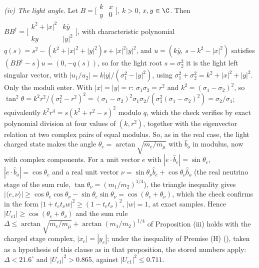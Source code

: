 \emph{(iv) The light angle.} Let $B = \bigl[\begin{smallmatrix} k & x\\ y & 0\end{smallmatrix}\bigr]$, $k > 0$, $x, y \in \C$. Then $BB^{\dagger} = \bigl[\begin{smallmatrix} k^{2} + |x|^{2} & k\bar{y}\\ ky & |y|^{2}\end{smallmatrix}\bigr]$, with characteristic polynomial $q(s) = s^{2} - (k^{2} + |x|^{2} + |y|^{2})s + |x|^{2}|y|^{2}$, and $u = (k\bar{y},\ s - k^{2} - |x|^{2})$ satisfies $(BB^{\dagger} - s)u = (0, -q(s))$, so for the light root $s = \sigma_{2}^{2}$ it is the light left singular vector, with $|u_{1}/u_{2}| = k|y|/(\sigma_{1}^{2} - |y|^{2})$, using $\sigma_{1}^{2} + \sigma_{2}^{2} = k^{2} + |x|^{2} + |y|^{2}$. Only the moduli enter. With $|x| = |y| = r$: $\sigma_{1}\sigma_{2} = r^{2}$ and $k^{2} = (\sigma_{1} - \sigma_{2})^{2}$, so $\tan^{2}\theta = k^{2}r^{2}/(\sigma_{1}^{2} - r^{2})^{2} = (\sigma_{1} - \sigma_{2})^{2}\sigma_{1}\sigma_{2}/(\sigma_{1}^{2}(\sigma_{1} - \sigma_{2})^{2}) = \sigma_{2}/\sigma_{1}$; equivalently $k^{2}r^{4} = s(k^{2} + r^{2} - s)^{2}$ modulo $q$, which the check verifies by exact polynomial division at four values of $(k, r^{2})$, together with the eigenvector relation at two complex pairs of equal modulus. So, as in the real case, the light charged state makes the angle $\theta_{e} = \arctan\sqrt{m_{e}/m_{\mu}}$ with $\hat{b}_{o}$ in modulus, now with complex components. For a unit vector $e$ with $|e\cdot\hat{b}_{e}| = \sin\theta_{e}$, $|e\cdot\hat{b}_{o}| = \cos\theta_{e}$ and a real unit vector $\nu = \sin\theta_{\nu}\hat{b}_{e} + \cos\theta_{\nu}\hat{b}_{o}$ (the real neutrino stage of the sum rule, $\tan\theta_{\nu} = (m_{1}/m_{2})^{1/4}$), the triangle inequality gives $|\langle e, \nu\rangle| \ge \cos\theta_{e}\cos\theta_{\nu} - \sin\theta_{e}\sin\theta_{\nu} = \cos(\theta_{e} + \theta_{\nu})$, which the check confirms in the form $|1 + t_{e}t_{\nu}w|^{2} \ge (1 - t_{e}t_{\nu})^{2}$, $|w| = 1$, at exact samples. Hence $|U_{e1}| \ge \cos(\theta_{e} + \theta_{\nu})$ and the sum rule $\Delta \le \arctan\sqrt{m_{e}/m_{\mu}} + \arctan(m_{1}/m_{2})^{1/4}$ of Proposition (iii) holds with the charged stage complex, $|x_{e}| = |y_{e}|$; under the inequality of Premise (H) (), taken as a hypothesis of this clause as in that proposition, the stored numbers apply: $\Delta < 21.6^{\circ}$ and $|U_{e1}|^{2} > 0.865$, against $|U_{e1}|^{2} \le 0.711$.

